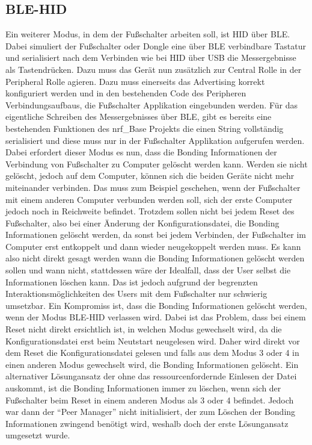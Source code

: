 \subsection{BLE-HID}
Ein weiterer Modus, in dem der Fußschalter arbeiten soll, ist HID über BLE. Dabei simuliert der Fußschalter oder Dongle eine über BLE verbindbare Tastatur und serialisiert nach dem Verbinden wie bei HID über USB die Messergebnisse als Tastendrücken. Dazu muss das Gerät nun zusätzlich zur Central Rolle in der Peripheral Rolle agieren. Dazu muss einerseits das Advertising korrekt konfiguriert werden und in den bestehenden Code des Peripheren Verbindungsaufbaus, die Fußschalter Applikation eingebunden werden. Für das eigentliche Schreiben des Messergebnisses über BLE, gibt es bereits eine bestehenden Funktionen des nrf\_Base Projekts die einen String vollständig serialisiert und diese muss nur in der Fußschalter Applikation aufgerufen werden.\\
Dabei erfordert dieser Modus es nun, dass die Bonding Informationen der Verbindung von Fußschalter zu Computer gelöscht werden kann. Werden sie nicht gelöscht, jedoch auf dem Computer, können sich die beiden Geräte nicht mehr miteinander verbinden. Das muss zum Beispiel geschehen, wenn der Fußschalter mit einem anderen Computer verbunden werden soll, sich der erste Computer jedoch noch in Reichweite befindet. Trotzdem sollen nicht bei jedem Reset des Fußschalter, also bei einer Änderung der Konfigurationsdatei, die Bonding Informationen gelöscht werden, da sonst bei jedem Verbinden, der Fußschalter im Computer erst entkoppelt und dann wieder neugekoppelt werden muss. Es kann also nicht direkt gesagt werden wann die Bonding Informationen gelöscht werden sollen und wann nicht, stattdessen wäre der Idealfall, dass der User selbst die Informationen löschen kann. Das ist jedoch aufgrund der begrenzten Interaktionsmöglichkeiten des Users mit dem Fußschalter nur schwierig umsetzbar. Ein Kompromiss ist, dass die Bonding Informationen gelöscht werden, wenn der Modus BLE-HID verlassen wird. Dabei ist das Problem, dass bei einem Reset nicht direkt ersichtlich ist, in welchen Modus gewechselt wird, da die Konfigurationsdatei erst beim Neutstart neugelesen wird. Daher wird direkt vor dem Reset die Konfigurationsdatei gelesen und falls aus dem Modus 3 oder 4 in einen anderen Modus gewechselt wird, die Bonding Informationen gelöscht. Ein alternativer Lösungansatz der ohne das ressourcenfordernde Einlesen der Datei auskommt, ist die Bonding Informationen immer zu löschen, wenn sich der Fußschalter beim Reset in einem anderen Modus als 3 oder 4 befindet. Jedoch war dann der ``Peer Manager'' nicht initialisiert, der zum Löschen der Bonding Informationen zwingend benötigt wird, weshalb doch der erste Lösungansatz umgesetzt wurde.\\
